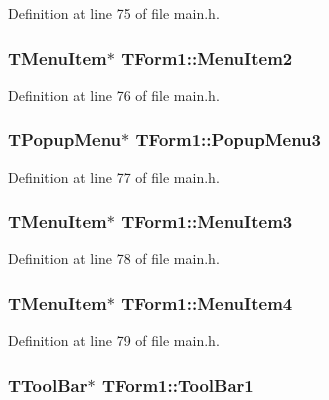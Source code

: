Definition at line 75 of file main.h.\hypertarget{classTForm1_991d92316da7bc45269d39af1fd998e5}{
\subsubsection[MenuItem2]{\setlength{\rightskip}{0pt plus 5cm}TMenuItem$\ast$ {\bf TForm1::MenuItem2}}}
\label{classTForm1_991d92316da7bc45269d39af1fd998e5}




Definition at line 76 of file main.h.\hypertarget{classTForm1_8084e0041ff8d5eb21b5632b4caf5fff}{
\subsubsection[PopupMenu3]{\setlength{\rightskip}{0pt plus 5cm}TPopupMenu$\ast$ {\bf TForm1::PopupMenu3}}}
\label{classTForm1_8084e0041ff8d5eb21b5632b4caf5fff}




Definition at line 77 of file main.h.\hypertarget{classTForm1_ef1f9c24509fa2b840942e0c522eaa49}{
\subsubsection[MenuItem3]{\setlength{\rightskip}{0pt plus 5cm}TMenuItem$\ast$ {\bf TForm1::MenuItem3}}}
\label{classTForm1_ef1f9c24509fa2b840942e0c522eaa49}




Definition at line 78 of file main.h.\hypertarget{classTForm1_1d34fca1a439e8d1b1899d0fd3734fa1}{
\subsubsection[MenuItem4]{\setlength{\rightskip}{0pt plus 5cm}TMenuItem$\ast$ {\bf TForm1::MenuItem4}}}
\label{classTForm1_1d34fca1a439e8d1b1899d0fd3734fa1}




Definition at line 79 of file main.h.\hypertarget{classTForm1_0b61aacff668f8478628ce9fb2c7679f}{
\subsubsection[ToolBar1]{\setlength{\rightskip}{0pt plus 5cm}TToolBar$\ast$ {\bf TForm1::ToolBar1}}}
\label{classTForm1_0b61aacff668f8478628ce9fb2c7679f}




